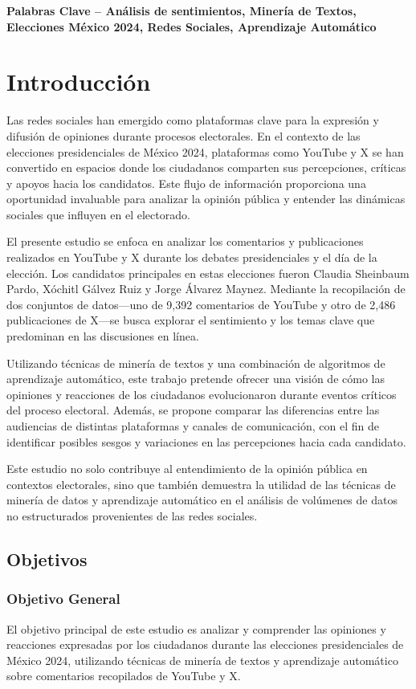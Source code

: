 \documentclass[10pt, a4paper]{article}
\begin{document}
	\textbf{Palabras Clave -- Análisis de sentimientos, Minería de Textos, Elecciones México 2024, Redes Sociales, Aprendizaje Automático}{\mykeywords}
	
	\section{Introducción}
	Las redes sociales han emergido como plataformas clave para la expresión y difusión de opiniones durante procesos electorales. En el contexto de las elecciones presidenciales de México 2024, plataformas como YouTube y X se han convertido en espacios donde los ciudadanos comparten sus percepciones, críticas y apoyos hacia los candidatos. Este flujo de información proporciona una oportunidad invaluable para analizar la opinión pública y entender las dinámicas sociales que influyen en el electorado.
	
	El presente estudio se enfoca en analizar los comentarios y publicaciones realizados en YouTube y X durante los debates presidenciales y el día de la elección. Los candidatos principales en estas elecciones fueron Claudia Sheinbaum Pardo, Xóchitl Gálvez Ruiz y Jorge Álvarez Maynez. Mediante la recopilación de dos conjuntos de datos—uno de 9,392 comentarios de YouTube y otro de 2,486 publicaciones de X—se busca explorar el sentimiento y los temas clave que predominan en las discusiones en línea.
	
	Utilizando técnicas de minería de textos y una combinación de algoritmos de aprendizaje automático, este trabajo pretende ofrecer una visión de cómo las opiniones y reacciones de los ciudadanos evolucionaron durante eventos críticos del proceso electoral. Además, se propone comparar las diferencias entre las audiencias de distintas plataformas y canales de comunicación, con el fin de identificar posibles sesgos y variaciones en las percepciones hacia cada candidato.
	
	Este estudio no solo contribuye al entendimiento de la opinión pública en contextos electorales, sino que también demuestra la utilidad de las técnicas de minería de datos y aprendizaje automático en el análisis de volúmenes de datos no estructurados provenientes de las redes sociales.
	
	\subsection{Objetivos}
	\subsubsection{Objetivo General}
	El objetivo principal de este estudio es analizar y comprender las opiniones y reacciones expresadas por los ciudadanos durante las elecciones presidenciales de México 2024, utilizando técnicas de minería de textos y aprendizaje automático sobre comentarios recopilados de YouTube y X. 
	
\end{document}

